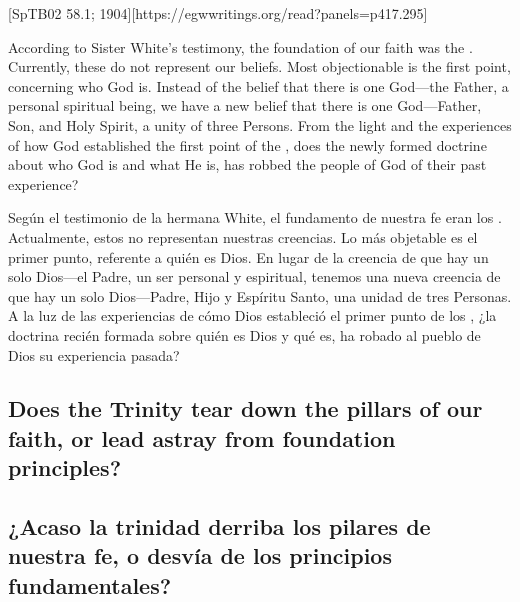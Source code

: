 [SpTB02 58.1; 1904][https://egwwritings.org/read?panels=p417.295]


According to Sister White’s testimony, the foundation of our faith was the . Currently, these do not represent our beliefs. Most objectionable is the first point, concerning who God is. Instead of the belief that there is one God—the Father, a personal spiritual being, we have a new belief that there is one God—Father, Son, and Holy Spirit, a unity of three Persons. From the light and the experiences of how God established the first point of the , does the newly formed doctrine about who God is and what He is, has robbed the people of God of their past experience?


Según el testimonio de la hermana White, el fundamento de nuestra fe eran los . Actualmente, estos no representan nuestras creencias. Lo más objetable es el primer punto, referente a quién es Dios. En lugar de la creencia de que hay un solo Dios—el Padre, un ser personal y espiritual, tenemos una nueva creencia de que hay un solo Dios—Padre, Hijo y Espíritu Santo, una unidad de tres Personas. A la luz de las experiencias de cómo Dios estableció el primer punto de los , ¿la doctrina recién formada sobre quién es Dios y qué es, ha robado al pueblo de Dios su experiencia pasada?


\subsection*{Does the Trinity tear down the pillars of our faith, or lead astray from foundation principles?}


\subsection*{¿Acaso la trinidad derriba los pilares de nuestra fe, o desvía de los principios fundamentales?}


